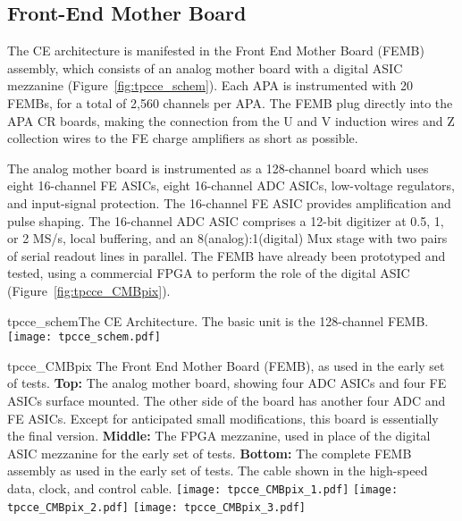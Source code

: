 %
\subsection{Front-End Mother Board}
\label{subsec:fe_arch}

The CE architecture is manifested in the Front End Mother Board (FEMB) assembly,
which consists of an analog mother board with a digital ASIC mezzanine (Figure~\ref{fig:tpcce_schem}).
Each APA is instrumented with 20 FEMBs, for a total of 2,560 channels per APA. The FEMB plug
directly into the APA CR boards, making the connection from the U and V induction wires and 
Z collection wires to the FE charge amplifiers as short as possible.

The analog mother board is instrumented as a 128-channel board which uses eight 16-channel FE ASICs,
eight 16-channel ADC ASICs, low-voltage regulators, and input-signal protection.
The 16-channel FE ASIC provides amplification and pulse shaping.
The 16-channel ADC ASIC comprises a 12-bit digitizer at 0.5, 1, or 2 MS/s, local buffering,
and an 8(analog):1(digital) Mux stage with two pairs of serial readout lines in parallel.
The FEMB have already been prototyped and tested,
using a commercial FPGA to perform the role of the digital ASIC (Figure~\ref{fig:tpcce_CMBpix}).

\begin{cdrfigure}{tpcce_schem}{The CE Architecture. The basic unit is the 128-channel FEMB.}
\texttt{[image: tpcce\_schem.pdf]}
\end{cdrfigure}

\begin{cdrfigure}{tpcce_CMBpix}
{The Front End Mother Board (FEMB), as used in the early set of tests.
  {\bf Top:} The analog mother board, showing four ADC ASICs and four FE ASICs surface mounted.
  The other side of the board has another four ADC and FE ASICs.
  Except for anticipated small modifications, this board is essentially the final version.
  {\bf Middle:} The FPGA mezzanine, used in place of the digital ASIC mezzanine for the early set of tests.
  {\bf Bottom:} The complete FEMB assembly as used in the early set of tests.
  The cable shown in the high-speed data, clock, and control cable.}
\texttt{[image: tpcce\_CMBpix\_1.pdf]}
\texttt{[image: tpcce\_CMBpix\_2.pdf]}
\texttt{[image: tpcce\_CMBpix\_3.pdf]}
\end{cdrfigure}

